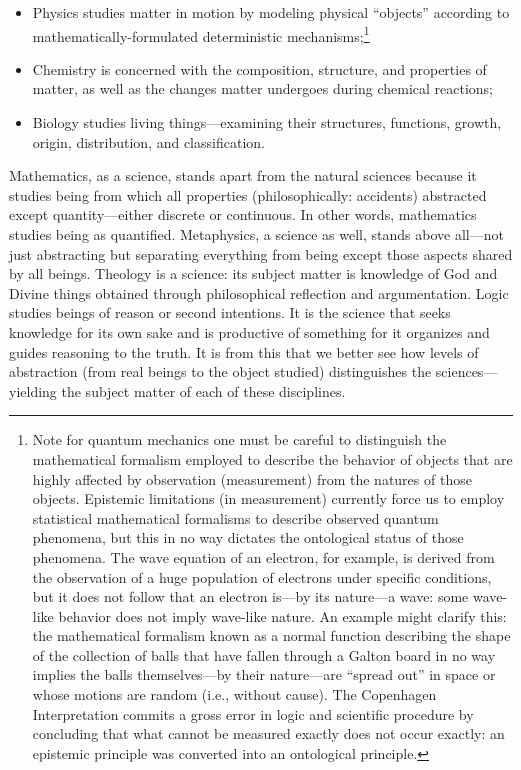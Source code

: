 \begin{itemize}
\item Physics studies matter in motion by modeling physical “objects” according to mathematically-formulated deterministic mechanisms;\footnote{Note for quantum mechanics one must be careful to distinguish the mathematical formalism employed to describe the behavior of objects that are highly affected by observation (measurement) from the natures of those objects. Epistemic limitations (in measurement) currently force us to employ statistical mathematical formalisms to describe observed quantum phenomena, but this in no way dictates the ontological status of those phenomena. The wave equation of an electron, for example, is derived from the observation of a huge population of electrons under specific conditions, but it does not follow that an electron is—by its nature—a wave: some wave-like behavior does not imply wave-like nature. An example might clarify this: the mathematical formalism known as a normal function describing the shape of the collection of balls that have fallen through a Galton board in no way implies the balls themselves—by their nature—are “spread out” in space or whose motions are random (i.e., without cause). The Copenhagen Interpretation commits a gross error in logic and scientific procedure by concluding that what cannot be measured exactly does not occur exactly: an epistemic principle was converted into an ontological principle.}
\item Chemistry is concerned with the composition, structure, and properties of matter, as well as the changes matter undergoes during chemical reactions;
\item Biology studies living things—examining their structures, functions, growth, origin, distribution, and classification.
\end{itemize}

Mathematics, as a science, stands apart from the natural sciences because it studies being from which all properties (philosophically: accidents) abstracted except quantity—either discrete or continuous. In other words, mathematics studies being as quantified. Metaphysics, a science as well, stands above all—not just abstracting but separating everything from being except those aspects shared by all beings. Theology is a science: its subject matter is knowledge of God and Divine things obtained through philosophical reflection and argumentation. Logic studies beings of reason or second intentions. It is the science that seeks knowledge for its own sake and is productive of something for it organizes and guides reasoning to the truth. It is from this that we better see how levels of abstraction (from real beings to the object studied) distinguishes the sciences—yielding the subject matter of each of these disciplines.


